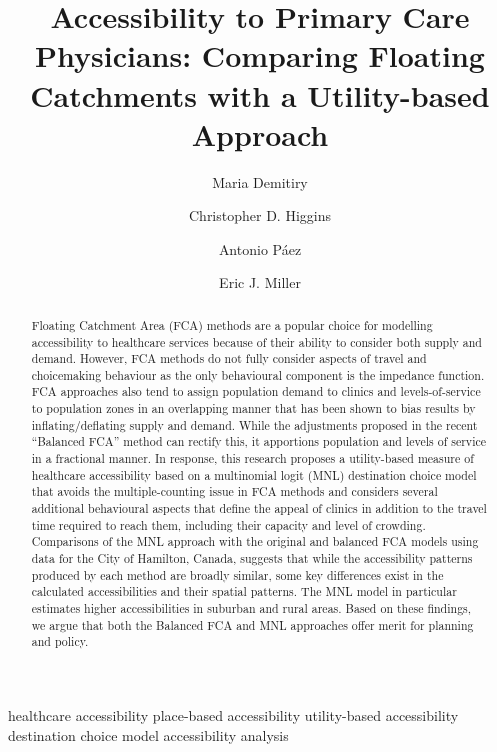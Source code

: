 \documentclass[]{elsarticle} %
\begin{document}
\begin{frontmatter}

  \title{Accessibility to Primary Care Physicians: Comparing Floating
Catchments with a Utility-based Approach}
    \author[University of Toronto]{Maria Demitiry}
    \author[University of Toronto Scarborough]{Christopher D.
Higgins}
    \author[McMaster University]{Antonio Páez}
    \author[University of Toronto]{Eric J. Miller}
      \address[University of Toronto]{Department of Civil and Mineral
Engineering, University of Toronto, 35 St.~George Street Toronto, ON.
Canada, M5S 1A4}
    \address[University of Toronto Scarborough]{Department of Human
Geography, 1265 Military Trail, Toronto, ON. Canada, M1C 1A4}
    \address[McMaster University]{School of Earth, Environment and
Society, McMaster University, 1280 Main St W, Hamilton, ON. Canada, L8S
4K1}
  
  \begin{abstract}
  Floating Catchment Area (FCA) methods are a popular choice for
  modelling accessibility to healthcare services because of their
  ability to consider both supply and demand. However, FCA methods do
  not fully consider aspects of travel and choicemaking behaviour as the
  only behavioural component is the impedance function. FCA approaches
  also tend to assign population demand to clinics and levels-of-service
  to population zones in an overlapping manner that has been shown to
  bias results by inflating/deflating supply and demand. While the
  adjustments proposed in the recent ``Balanced FCA'' method can rectify
  this, it apportions population and levels of service in a fractional
  manner. In response, this research proposes a utility-based measure of
  healthcare accessibility based on a multinomial logit (MNL)
  destination choice model that avoids the multiple-counting issue in
  FCA methods and considers several additional behavioural aspects that
  define the appeal of clinics in addition to the travel time required
  to reach them, including their capacity and level of crowding.
  Comparisons of the MNL approach with the original and balanced FCA
  models using data for the City of Hamilton, Canada, suggests that
  while the accessibility patterns produced by each method are broadly
  similar, some key differences exist in the calculated accessibilities
  and their spatial patterns. The MNL model in particular estimates
  higher accessibilities in suburban and rural areas. Based on these
  findings, we argue that both the Balanced FCA and MNL approaches offer
  merit for planning and policy.
  \end{abstract}
   \begin{keyword} healthcare accessibility place-based
accessibility utility-based accessibility destination choice
model accessibility analysis\end{keyword}
 \end{frontmatter}
\end{document}
